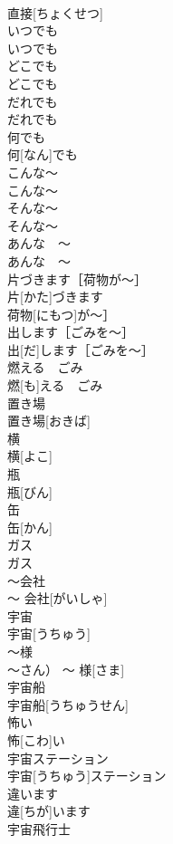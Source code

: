 \documentclass[8pt]{extreport}
\begin{document}
\begin{CJK}{UTF8}{min}
\\	直接[ちょくせつ]	
\\	いつでも	
\\	いつでも	
\\	どこでも	
\\	どこでも	
\\	だれでも	
\\	だれでも	
\\	何でも	
\\	何[なん]でも	
\\	こんな〜	
\\	こんな〜	
\\	そんな〜	
\\	そんな〜	
\\	あんな　〜	
\\	あんな　〜	
\\	片づきます［荷物が〜］	
\\	片[かた]づきます
\\	荷物[にもつ]が〜］	
\\	出します［ごみを〜］	
\\	出[だ]します［ごみを〜］	
\\	燃える　ごみ	
\\	燃[も]える　ごみ	
\\	置き場	
\\	置き場[おきば]	
\\	横	
\\	横[よこ]	
\\	瓶	
\\	瓶[びん]	
\\	缶	
\\	缶[かん]	
\\	ガス	
\\	ガス	
\\	〜会社	
\\	〜 会社[がいしゃ]	
\\	宇宙	
\\	宇宙[うちゅう]	
\\	〜様	
\\	〜さん）	〜 様[さま]	
\\	宇宙船	
\\	宇宙船[うちゅうせん]	
\\	怖い	
\\	怖[こわ]い	
\\	宇宙ステーション	
\\	宇宙[うちゅう]ステーション	
\\	違います	
\\	違[ちが]います	
\\	宇宙飛行士	

\end{CJK}
\end{document}
